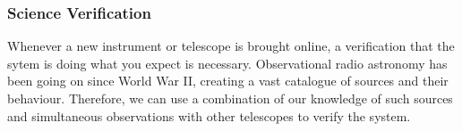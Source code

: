 \subsubsection{Science Verification}

Whenever a new instrument or telescope is brought online, a verification that the sytem is doing what you expect is necessary. Observational radio astronomy has been going on since World War II, creating a vast catalogue of sources and their behaviour. Therefore, we can use a combination of our knowledge of such sources and simultaneous observations with other telescopes to verify the system. 

